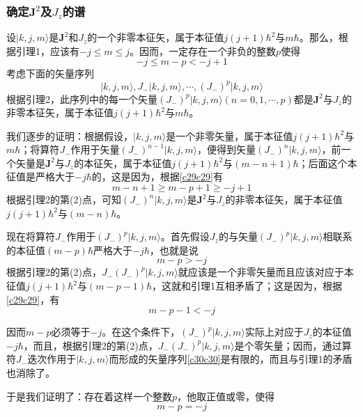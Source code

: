\documentclass[]{article}
\begin{document}
\subsubsection{确定$\boldsymbol{J}^2$及$J_z$的谱}
设$|k,j,m\rangle$是$\boldsymbol{J}^2$和$J_z$的一个非零本征矢，属于本征值$j(j+1)\hbar^2$与$m\hbar$。那么，根据引理1，应该有$-j\leqslant m\leqslant j$。因而，一定存在一个非负的整数$p$使得
\begin{equation}
	-j\leqslant m-p<-j+1
	\label{c29c29}
\end{equation}
考虑下面的矢量序列
\begin{equation}
	|k,j,m\rangle,J_-|k,j,m\rangle,\cdots,(J_-)^p|k,j,m\rangle
	\label{c30c30}
\end{equation}
根据引理2，此序列中的每一个矢量$(J_-)^p|k,j,m\rangle(n=0,1,\cdots,p)$都是$\boldsymbol{J}^2$与$J_z$的非零本征矢，属于本征值$j(j+1)\hbar^2$与$m\hbar$。\par 
我们逐步的证明：根据假设，$|k,j,m\rangle$是一个非零矢量，属于本征值$j(j+1)\hbar^2$与$m\hbar$；将算符$J_-$作用于矢量$(J_-)^{n-1}|k,j,m\rangle$，便得到矢量$(J_-)^n|k,j,m\rangle$，前一个矢量是$\boldsymbol{J}^2$与$J_z$的本征矢，属于本征值$j(j+1)\hbar^2$与$(m-n+1)\hbar$；后面这个本征值是严格大于$-j\hbar$的，这是因为，根据\eqref{c29c29}有
\begin{equation}
	m-n+1\geqslant m-p+1\geqslant-j+1
\end{equation}
根据引理2的第(2)点，可知$(J_-)^n|k,j,m\rangle$是$\boldsymbol{J}^2$与$J_z$的非零本征矢，属于本征值$j(j+1)\hbar^2$与$(m-n)\hbar$。\par 
现在将算符$J_-$作用于$(J_-)^p|k,j,m\rangle$。首先假设$J_z$的与矢量$(J_-)^p|k,j,m\rangle$相联系的本征值$(m-p)\hbar$严格大于$-j\hbar$，也就是说
\begin{equation}
	m-p>-j
\end{equation}
根据引理2的第(2)点，$J_-(J_-)^p|k,j,m\rangle$就应该是一个非零矢量而且应该对应于本征值$j(j+1)\hbar^2$与$(m-p-1)\hbar$，这就和引理1互相矛盾了；这是因为，根据\eqref{c29c29}，有
\begin{equation}
	m-p-1<-j
\end{equation}

因而$m-p$必须等于$-j$。在这个条件下，$(J_-)^p|k,j,m\rangle$实际上对应于$J_z$的本征值$-j\hbar$，而且，根据引理2的第(2)点，$J_-(J_-)^p|k,j,m\rangle$是个零矢量；因而，通过算符$J_-$迭次作用于$|k,j,m\rangle$而形成的矢量序列\eqref{c30c30}是有限的，而且与引理1的矛盾也消除了。\par 
于是我们证明了：存在着这样一个整数$p$，他取正值或零，使得
\begin{equation}
	m-p=-j
	\label{c34c34}
\end{equation}
\end{document}
